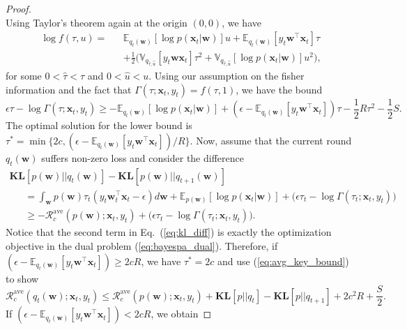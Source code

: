 \documentclass[twoside,11pt]{article}
\newcommand{\xv}{\bm{x}}
\newcommand{\regret}{\mathcal{R}}
\newcommand{\wv}{\bm{w}}
\newcommand{\ep}{\mathbb{E}}
\newcommand{\KL}{\textbf{KL}}
\newcommand{\var}{\mathbb{V}}
\newcommand{\E}{\mathbb{E}}
\begin{document}
{\begin{proof}
{\begin{equation*}
\end{equation*}}
Using Taylor's theorem again at the origin $(0,0)$, we have
\setlength\arraycolsep{1pt}\begin{eqnarray}
\log f(\tau, u) = && \ep_{q_t(\wv)} \left[\log p(\xv_t | \wv) \right] u +\E_{q_{t}(\wv)}\left[ y_t \wv^\top \xv_t \right] \tau  \nonumber \\
&& +\frac{1}{2} \Big(\var_{q_{\hat{\tau}, \hat{u}}}\left[y_t \wv \xv_t\right] \tau^2+\var_{q_{\hat{\tau}, \hat{u}}}\left[\log p(\xv_t | \wv)\right] u^2\Big), \nonumber
\end{eqnarray}
for some $0 < \hat{\tau} < \tau$ and $0 < \hat{u} < u$. Using our assumption on the fisher information and the fact that $\Gamma(\tau; \xv_t, y_t) = f(\tau, 1)$, we have the bound
\begin{equation} \label{eq:avg_key_bound}
\epsilon \tau - \log \Gamma(\tau; \xv_t, y_t) \geq -\ep_{q_t(\wv)} \left[\log p(\xv_t | \wv) \right]+\left( \epsilon-\E_{q_{t}(\wv)}\left[ y_t \wv^\top \xv_t \right] \right) \tau - \frac{1}{2} R \tau^2-\frac{1}{2} S.
\end{equation}
The optimal solution for the lower bound is $\tau^* = \min\{2c, (\epsilon-\E_{q_{t}(\wv)}[y_t \wv^\top \xv_t])/R\}$. Now, assume that the current round $q_t(\wv)$ suffers non-zero loss and consider the difference
\begin{equation}
\begin{array}{l}
\KL\left[p(\wv) || q_t(\wv)\right]-\KL\left[p(\wv) || q_{t+1}(\wv)\right]  \\
~~~~~~~ = \int_{\wv}{p(\wv) \tau_t\left( y_t \wv_t^\top \xv_t-\epsilon \right) d\wv}+\ep_{p(\wv)}[\log p(\xv_t | \wv)]+\Big(\epsilon \tau_t-\log \Gamma(\tau_t; \xv_t, y_t) \Big) \\
~~~~~~~ \geq -\regret_{c}^\text{ave}(p(\wv); \xv_t, y_t)+\Big(\epsilon \tau_t-\log \Gamma(\tau_t; \xv_t, y_t) \Big). \label{eq:kl_diff}
 \end{array}
\end{equation}
Notice that the second term in Eq.~(\ref{eq:kl_diff}) is exactly the optimization objective in the dual problem (\ref{eq:bayespa_dual}). Therefore, if $(\epsilon-\E_{q_{t}(\wv)}[y_t \wv^\top \xv_t]) \geq 2cR$, we have $\tau^* = 2c$ and use (\ref{eq:avg_key_bound}) to show
\begin{equation*}
\regret_c^\text{ave}(q_t(\wv); \xv_t, y_t) \leq \regret_{c}^\text{ave}(p(\wv); \xv_t, y_t)+ \KL[p || q_t]-\KL[p || q_{t+1}] +2 c^2 R + \frac{S}{2}.
\end{equation*}
If $(\epsilon-\E_{q_{t}(\wv)}[y_t \wv^\top \xv_t]) < 2cR$, we obtain


\end{proof}}
\end{document}
